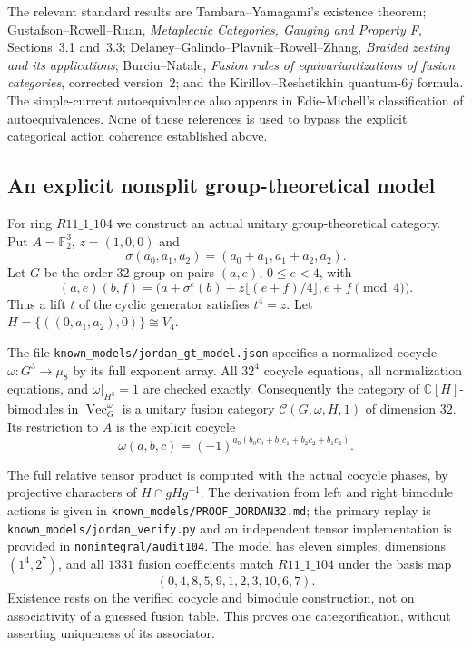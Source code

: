 \documentclass[11pt,a4paper]{article}
\begin{document}
The relevant standard results are Tambara--Yamagami's existence theorem;
Gustafson--Rowell--Ruan, \emph{Metaplectic Categories, Gauging and
Property F}, Sections~3.1 and~3.3; Delaney--Galindo--Plavnik--Rowell--Zhang,
\emph{Braided zesting and its applications}; Burciu--Natale,
\emph{Fusion rules of equivariantizations of fusion categories}, corrected
version~2; and the Kirillov--Reshetikhin quantum-$6j$ formula.  The
simple-current autoequivalence also appears in Edie-Michell's
classification of autoequivalences.  None of these references is used
to bypass the explicit categorical action coherence established above.

\subsection{An explicit nonsplit group-theoretical model}
For ring $R11\_1\_104$ we construct an actual unitary group-theoretical
category.  Put $A=\mathbb F_2^3$, $z=(1,0,0)$ and
\[
 \sigma(a_0,a_1,a_2)=(a_0+a_1,a_1+a_2,a_2).
\]
Let $G$ be the order-$32$ group on pairs $(a,e)$, $0\leq e<4$, with
\[
 (a,e)(b,f)=\bigl(a+\sigma^e(b)+z\lfloor(e+f)/4\rfloor,
                         e+f\pmod4\bigr).
\]
Thus a lift $t$ of the cyclic generator satisfies $t^4=z$.  Let
$H=\{((0,a_1,a_2),0)\}\cong V_4$.

The file \texttt{known\_models/jordan\_gt\_model.json} specifies a
normalized cocycle $\omega:G^3\to\mu_8$ by its full exponent array.
All $32^4$ cocycle equations, all normalization equations, and
$\omega|_{H^3}=1$ are checked exactly.  Consequently the category of
$\mathbb C[H]$-bimodules in $\operatorname{Vec}_G^\omega$ is a unitary
fusion category $\mathcal C(G,\omega,H,1)$ of dimension $32$.
Its restriction to $A$ is the explicit cocycle
\[
 \omega(a,b,c)=(-1)^{a_0(b_0c_0+b_1c_1+b_2c_2+b_1c_2)}.
\]

The full relative tensor product is computed with the actual cocycle
phases, by projective characters of $H\cap gHg^{-1}$.  The derivation
from left and right bimodule actions is given in
\texttt{known\_models/PROOF\_JORDAN32.md}; the primary replay is
\texttt{known\_models/jordan\_verify.py} and an independent tensor
implementation is provided in \texttt{nonintegral/audit104}.
The model has eleven simples, dimensions $(1^4,2^7)$, and all
$1331$ fusion coefficients match $R11\_1\_104$ under the basis map
\[
 (0,4,8,5,9,1,2,3,10,6,7).
\]
Existence rests on the verified cocycle and bimodule construction,
not on associativity of a guessed fusion table.  This proves one
categorification, without asserting uniqueness of its associator.
\end{document}

